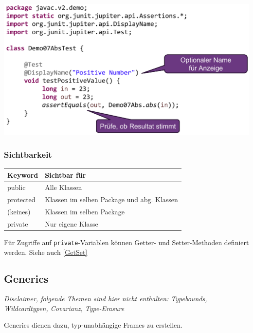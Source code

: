 \begin{center}
    \includegraphics[width=0.9\columnwidth]{pictures/testmethode.png}    
\end{center}

\subsubsection{Sichtbarkeit}
\begin{center}
    \begin{tabular}{ll}
        \rowcolor[RGB]{239,239,239} 
        \textbf{Keyword} & \textbf{Sichtbar für} \\ \hline
        public & Alle Klassen \\
        protected & Klassen im selben Package und abg. Klassen\\
        (keines) & Klassen im selben Package \\
        private & Nur eigene Klasse \\
    \end{tabular}
\end{center}

Für Zugriffe auf \verb|private|-Variablen können Getter- und Setter-Methoden definiert werden. Siehe auch \ref{GetSet}


\subsection{Generics}

\textit{Disclaimer, folgende Themen sind hier nicht enthalten: Typebounds, Wildcardtypen, Covarianz, Type-Erasure}

Generics dienen dazu, typ-unabhängige Frames zu erstellen. 

